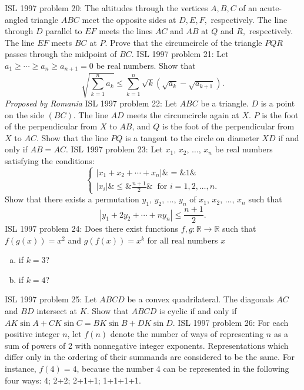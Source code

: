 ISL 1997 problem 20:  The altitudes through the vertices $ A,B,C$ of an acute-angled triangle $ ABC$ meet the opposite sides at $ D,E, F,$ respectively. The line through $ D$ parallel to $ EF$ meets the lines $ AC$ and $ AB$ at $ Q$ and $ R,$ respectively. The line $ EF$ meets $ BC$ at $ P.$ Prove that the circumcircle of the triangle $ PQR$ passes through the midpoint of $ BC.$ 
ISL 1997 problem 21:  Let $ a_1\geq \cdots \geq a_n \geq a_{n + 1} = 0$ be real numbers. Show that
\[ \sqrt {\sum_{k = 1}^n a_k} \leq \sum_{k = 1}^n \sqrt k (\sqrt {a_k} - \sqrt {a_{k + 1}}). \]
\textit{Proposed by Romania} 
ISL 1997 problem 22:  Let $ ABC$ be a triangle. $ D$ is a point on the side $ (BC)$. The line $ AD$ meets the circumcircle again at $ X$. $ P$ is the foot of the perpendicular from $ X$ to $ AB$, and $ Q$ is the foot of the perpendicular from $ X$ to $ AC$. Show that the line $ PQ$ is a tangent to the circle on diameter $ XD$ if and only if $ AB = AC$. 
ISL 1997 problem 23:  Let $ x_1$, $ x_2$, $ \ldots$, $ x_n$  be real numbers satisfying the conditions:
\[
\left\{
\begin{array}{cccc} |x_1 + x_2 + \cdots + x_n | \& = \& 1 \& \ \\
|x_i| \& \leq \& \displaystyle \frac {n + 1}{2} \& \ \textrm{ for }i = 1, 2, \ldots , n. \end{array}
\right.
\]
Show that there exists a permutation   $ y_1$, $ y_2$, $ \ldots$, $ y_n$  of $ x_1$, $ x_2$, $ \ldots$, $ x_n$  such that
\[ | y_1 + 2 y_2 + \cdots + n y_n | \leq \frac {n + 1}{2}. \] 
ISL 1997 problem 24:  Does there exist functions $ f,g: \mathbb{R}\to\mathbb{R}$ such that  $ f(g(x)) = x^2$ and $ g(f(x)) = x^k$ for all real numbers $ x$
\begin{enumerate}[a)]
  \item if $ k = 3$?
  \item if $ k = 4$?
\end{enumerate} 
ISL 1997 problem 25:  Let $ ABCD$ be a convex quadrilateral. The diagonals $ AC$ and $ BD$ intersect at $ K$. Show that $ ABCD$ is cyclic if and only if $ AK \sin A + CK \sin C = BK \sin B + DK \sin D$. 
ISL 1997 problem 26:  For each positive integer $ n$, let $ f(n)$ denote the number of ways of representing $ n$ as a sum of powers of 2 with nonnegative integer exponents. Representations which differ only in the ordering of their summands are considered to be the same. For instance, $ f(4) = 4$, because the number 4 can be represented in the following four ways: 4; 2+2; 2+1+1; 1+1+1+1. \\\\
